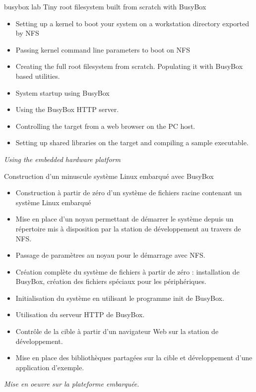 {busybox}
{lab}
{Tiny root filesystem built from scratch with BusyBox}
{
  \begin{itemize}
  \item Setting up a kernel to boot your system on a workstation
    directory exported by NFS
  \item Passing kernel command line parameters to boot on NFS
  \item Creating the full root filesystem from scratch.
    Populating it with BusyBox based utilities.
  \item System startup using BusyBox 
  \item Using the BusyBox HTTP server.
  \item Controlling the target from a web browser on the PC host.
  \item Setting up shared libraries on the target and compiling
    a sample executable.
  \end{itemize}

  \vspace{0.5cm}
  {\em Using the embedded hardware platform}
}
{Construction d'un minuscule système Linux embarqué avec BusyBox}
{
  \begin{itemize}
  \item Construction à partir de zéro d'un système de fichiers racine
    contenant un système Linux embarqué
  \item Mise en place d'un noyau permettant de démarrer le système
    depuis un répertoire mis à disposition par la station de
    développement au travers de NFS.
  \item Passage de paramètres au noyau pour le démarrage avec NFS.
  \item Création complète du système de fichiers à partir de zéro :
    installation de BusyBox, création des fichiers spéciaux pour les
    périphériques.
  \item Initialisation du système en utilisant le programme init de BusyBox.
  \item Utilisation du serveur HTTP de BusyBox.
  \item Contrôle de la cible à partir d'un navigateur Web sur la
    station de développement.
  \item Mise en place des bibliothèques partagées sur la cible et
    développement d'une application d'exemple.
  \end{itemize}

  \vspace{0.5cm}
  {\em Mise en oeuvre sur la plateforme embarquée.}
}
